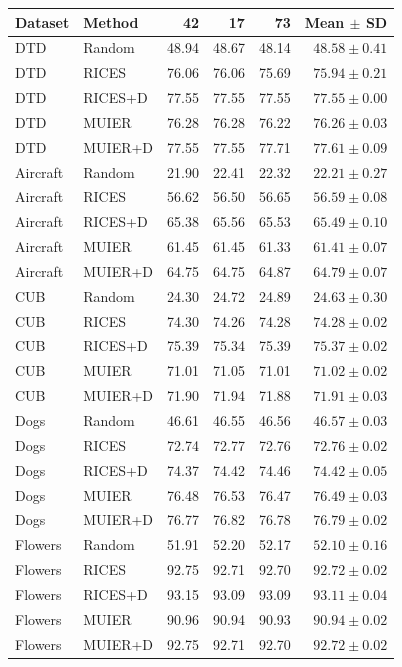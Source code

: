 \begin{tabular}{llrrrr}
\toprule
Dataset & Method & 42 & 17 & 73 & Mean $\pm$ SD \\
\midrule
DTD & Random & 48.94 & 48.67 & 48.14 & $48.58 \pm 0.41$ \\
DTD & RICES & 76.06 & 76.06 & 75.69 & $75.94 \pm 0.21$ \\
DTD & RICES+D & 77.55 & 77.55 & 77.55 & $77.55 \pm 0.00$ \\
DTD & MUIER & 76.28 & 76.28 & 76.22 & $76.26 \pm 0.03$ \\
DTD & MUIER+D & 77.55 & 77.55 & 77.71 & $77.61 \pm 0.09$ \\
Aircraft & Random & 21.90 & 22.41 & 22.32 & $22.21 \pm 0.27$ \\
Aircraft & RICES & 56.62 & 56.50 & 56.65 & $56.59 \pm 0.08$ \\
Aircraft & RICES+D & 65.38 & 65.56 & 65.53 & $65.49 \pm 0.10$ \\
Aircraft & MUIER & 61.45 & 61.45 & 61.33 & $61.41 \pm 0.07$ \\
Aircraft & MUIER+D & 64.75 & 64.75 & 64.87 & $64.79 \pm 0.07$ \\
CUB & Random & 24.30 & 24.72 & 24.89 & $24.63 \pm 0.30$ \\
CUB & RICES & 74.30 & 74.26 & 74.28 & $74.28 \pm 0.02$ \\
CUB & RICES+D & 75.39 & 75.34 & 75.39 & $75.37 \pm 0.02$ \\
CUB & MUIER & 71.01 & 71.05 & 71.01 & $71.02 \pm 0.02$ \\
CUB & MUIER+D & 71.90 & 71.94 & 71.88 & $71.91 \pm 0.03$ \\
Dogs & Random & 46.61 & 46.55 & 46.56 & $46.57 \pm 0.03$ \\
Dogs & RICES & 72.74 & 72.77 & 72.76 & $72.76 \pm 0.02$ \\
Dogs & RICES+D & 74.37 & 74.42 & 74.46 & $74.42 \pm 0.05$ \\
Dogs & MUIER & 76.48 & 76.53 & 76.47 & $76.49 \pm 0.03$ \\
Dogs & MUIER+D & 76.77 & 76.82 & 76.78 & $76.79 \pm 0.02$ \\
Flowers & Random & 51.91 & 52.20 & 52.17 & $52.10 \pm 0.16$ \\
Flowers & RICES & 92.75 & 92.71 & 92.70 & $92.72 \pm 0.02$ \\
Flowers & RICES+D & 93.15 & 93.09 & 93.09 & $93.11 \pm 0.04$ \\
Flowers & MUIER & 90.96 & 90.94 & 90.93 & $90.94 \pm 0.02$ \\
Flowers & MUIER+D & 92.75 & 92.71 & 92.70 & $92.72 \pm 0.02$ \\
\bottomrule
\end{tabular}
